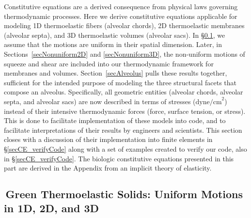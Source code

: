 Constitutive equations are a derived consequence from physical laws governing thermo\-dynamic processes.  Here we derive constitutive equations applicable for modeling 1D thermo\-elastic fibers (alveolar chords), 2D thermo\-elastic membranes (alveolar septa), and 3D thermo\-elastic volumes (alveolar sacs).  In \S\ref{secUniformCE}, we assume that the motions are uniform in their spatial dimension.  Later, in Sections~\ref{secNonuniform2D} and \ref{secNonuniform3D}, the non-uniform motions of squeeze and shear are included into our thermo\-dynamic framework for membranes and volumes.  Section~\ref{secAlveolus} pulls these results together, sufficient for the intended purpose of modeling the three structural facets that compose an alveolus.  Specifically, all geometric entities (alveolar chords, alveolar septa, and alveolar sacs) are now described in terms of stresses ($\text{dyne/cm}^2$) instead of their intensive thermo\-dynamic forces (force, surface tension, or stress).  This is done to facilitate implementation of these models into code, and to facilitate interpretations of their results by engineers and scientists.  This section closes with a discussion of their implementation into finite elements in \S\ref{secCE_verifyCode} along with a set of examples created to verify our code, also in \S\ref{secCE_verifyCode}.  The biologic constitutive equations presented in this part are derived in the Appendix from an implicit theory of elasticity.

\subsection{$\,$Green Thermoelastic Solids: Uniform Motions in 1D, 2D, and 3D}
\label{secUniformCE}


